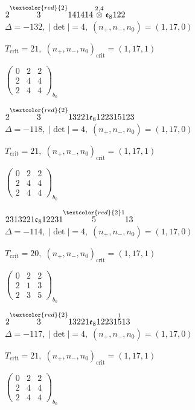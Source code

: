 \documentclass[10pt]{article}
\begin{document}
$2\overset{\textcolor{red}{2}}{3}141414\overset{2,4}{\otimes}\mathfrak{e}_8122$ \quad $\Delta=-132,\; |\det|=4,\; (n_+,n_-,n_0)=(1,17,0)$

\hspace{1em}$T_{\text{crit}}=21,\; (n_+,n_-,n_0)_{\text{crit}}=(1,17,1)$

\hspace{2em}$\left(\begin{smallmatrix}0 & 2 & 2 \\ 2 & 4 & 4 \\ 2 & 4 & 4\end{smallmatrix}\right)_{\!b_0}$

\smallskip

$2\overset{\textcolor{red}{2}}{3}13221\mathfrak{e}_8122315123$ \quad $\Delta=-118,\; |\det|=4,\; (n_+,n_-,n_0)=(1,17,0)$

\hspace{1em}$T_{\text{crit}}=21,\; (n_+,n_-,n_0)_{\text{crit}}=(1,17,1)$

\hspace{2em}$\left(\begin{smallmatrix}0 & 2 & 2 \\ 2 & 4 & 4 \\ 2 & 4 & 4\end{smallmatrix}\right)_{\!b_0}$

\smallskip

$2313221\mathfrak{e}_812231\overset{\textcolor{red}{2}1}{5}13$ \quad $\Delta=-114,\; |\det|=4,\; (n_+,n_-,n_0)=(1,17,0)$

\hspace{1em}$T_{\text{crit}}=20,\; (n_+,n_-,n_0)_{\text{crit}}=(1,17,1)$

\hspace{2em}$\left(\begin{smallmatrix}0 & 2 & 2 \\ 2 & 1 & 3 \\ 2 & 3 & 5\end{smallmatrix}\right)_{\!b_0}$

$2\overset{\textcolor{red}{2}}{3}13221\mathfrak{e}_812231\overset{1}{5}13$ \quad $\Delta=-117,\; |\det|=4,\; (n_+,n_-,n_0)=(1,17,0)$

\hspace{1em}$T_{\text{crit}}=21,\; (n_+,n_-,n_0)_{\text{crit}}=(1,17,1)$

\hspace{2em}$\left(\begin{smallmatrix}0 & 2 & 2 \\ 2 & 4 & 4 \\ 2 & 4 & 4\end{smallmatrix}\right)_{\!b_0}$
\end{document}
